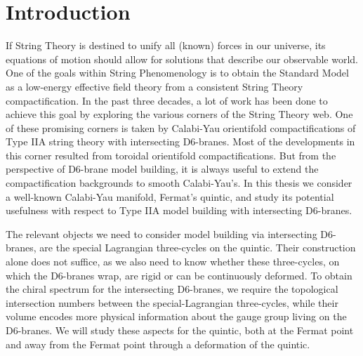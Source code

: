 \chapter{Introduction}

If String Theory is destined to unify all (known) forces in our universe, its equations of motion should allow for solutions that describe our observable world. One of the goals within String Phenomenology is to obtain the Standard Model as a low-energy effective field theory from a consistent String Theory compactification. In the past three decades, a lot of work has been done to achieve this goal by exploring the various corners of the String Theory web. One of these promising corners is taken by Calabi-Yau orientifold compactifications of Type IIA string theory with intersecting D6-branes. Most of the developments in this corner resulted from toroidal orientifold compactifications. But from the perspective of D6-brane model building, it is always useful to extend the compactification backgrounds to smooth Calabi-Yau's. In this thesis we consider a well-known Calabi-Yau manifold, Fermat's quintic, and study its potential usefulness with respect to  Type IIA model building with intersecting D6-branes.


The relevant objects we need to consider model building via intersecting D6-branes, are the special Lagrangian three-cycles on the quintic. Their construction alone does not suffice, as we also need to know whether these three-cycles, on which the D6-branes wrap, are rigid or can be continuously deformed. To obtain the chiral spectrum for the intersecting D6-branes, we require the topological intersection numbers between the special-Lagrangian three-cycles, while their volume encodes more physical information about the gauge group living on the D6-branes. We will study these aspects for the quintic, both at the Fermat point and away from the Fermat point through a deformation of the quintic.

